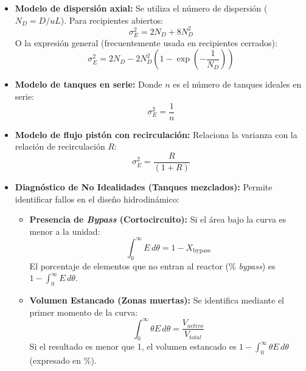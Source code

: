 \begin{itemize}
    \item \textbf{Modelo de dispersión axial:}
          Se utiliza el número de dispersión ($N_D = D/uL$). Para recipientes abiertos:
          \begin{equation}
              \sigma^2_E = 2 N_D + 8 N_D^2
          \end{equation}
          O la expresión general (frecuentemente usada en recipientes cerrados):
          \begin{equation}
              \sigma^2_E = 2 N_D - 2 N_D^2 \left( 1 - \exp\left( -\frac{1}{N_D} \right) \right)
          \end{equation}

    \item \textbf{Modelo de tanques en serie:}
          Donde $n$ es el número de tanques ideales en serie:
          \begin{equation}
              \sigma^2_E = \frac{1}{n}
          \end{equation}

    \item \textbf{Modelo de flujo pistón con recirculación:}
          Relaciona la varianza con la relación de recirculación $R$:
          \begin{equation}
              \sigma^2_E = \frac{R}{(1+R)}
          \end{equation}

    \item \textbf{Diagnóstico de No Idealidades (Tanques mezclados):}
          Permite identificar fallos en el diseño hidrodinámico:
          \begin{itemize}
              \item \textbf{Presencia de \textit{Bypass} (Cortocircuito):}
                    Si el área bajo la curva es menor a la unidad:
                    \begin{equation}
                        \int_{0}^{\infty} E \, d\theta = 1 - X_{\text{bypass}}
                    \end{equation}
                    El porcentaje de elementos que no entran al reactor (\% \textit{bypass}) es $1 - \int_{0}^{\infty} E \, d\theta$.

              \item \textbf{Volumen Estancado (Zonas muertas):}
                    Se identifica mediante el primer momento de la curva:
                    \begin{equation}
                        \int_{0}^{\infty} \theta E \, d\theta = \frac{V_{activo}}{V_{total}}
                    \end{equation}
                    Si el resultado es menor que 1, el volumen estancado es $1 - \int_{0}^{\infty} \theta E \, d\theta$ (expresado en \%).
          \end{itemize}


\end{itemize}
